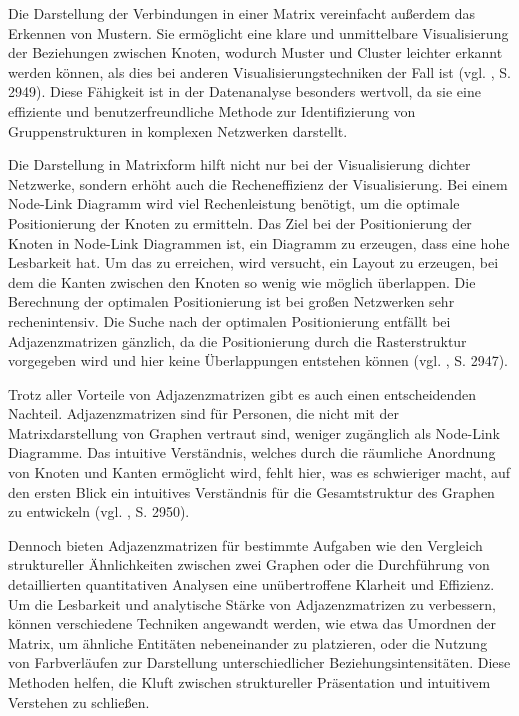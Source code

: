 Die Darstellung der Verbindungen in einer Matrix vereinfacht außerdem das Erkennen von Mustern. Sie ermöglicht eine klare und unmittelbare Visualisierung der Beziehungen zwischen Knoten, wodurch Muster und Cluster leichter erkannt werden können, als dies bei anderen Visualisierungstechniken der Fall ist (vgl. \cite{adjacencyOrNode:Okoe}, S. 2949). Diese Fähigkeit ist in der Datenanalyse besonders wertvoll, da sie eine effiziente und benutzerfreundliche Methode zur Identifizierung von Gruppenstrukturen in komplexen Netzwerken darstellt.

Die Darstellung in Matrixform hilft nicht nur bei der Visualisierung dichter Netzwerke, sondern erhöht auch die Recheneffizienz der Visualisierung. Bei einem Node-Link Diagramm wird viel Rechenleistung benötigt, um die optimale Positionierung der Knoten zu ermitteln. Das Ziel bei der Positionierung der Knoten in Node-Link Diagrammen ist, ein Diagramm zu erzeugen, dass eine hohe Lesbarkeit hat. Um das zu erreichen, wird versucht, ein Layout zu erzeugen, bei dem die Kanten zwischen den Knoten so wenig wie möglich überlappen. Die Berechnung der optimalen Positionierung ist bei großen Netzwerken sehr rechenintensiv. Die Suche nach der optimalen Positionierung entfällt bei Adjazenzmatrizen gänzlich, da die Positionierung durch die Rasterstruktur vorgegeben wird und hier keine Überlappungen entstehen können (vgl. \cite{adjacencyOrNode:Okoe}, S. 2947).

Trotz aller Vorteile von Adjazenzmatrizen gibt es auch einen entscheidenden Nachteil. Adjazenzmatrizen sind für Personen, die nicht mit der Matrixdarstellung von Graphen vertraut sind, weniger zugänglich als Node-Link Diagramme. Das intuitive Verständnis, welches durch die räumliche Anordnung von Knoten und Kanten ermöglicht wird, fehlt hier, was es schwieriger macht, auf den ersten Blick ein intuitives Verständnis für die Gesamtstruktur des Graphen zu entwickeln (vgl. \cite{adjacencyOrNode:Okoe}, S. 2950).

Dennoch bieten Adjazenzmatrizen für bestimmte Aufgaben wie den Vergleich struktureller Ähnlichkeiten zwischen zwei Graphen oder die Durchführung von detaillierten quantitativen Analysen eine unübertroffene Klarheit und Effizienz. Um die Lesbarkeit und analytische Stärke von Adjazenzmatrizen zu verbessern, können verschiedene Techniken angewandt werden, wie etwa das Umordnen der Matrix, um ähnliche Entitäten nebeneinander zu platzieren, oder die Nutzung von Farbverläufen zur Darstellung unterschiedlicher Beziehungsintensitäten. Diese Methoden helfen, die Kluft zwischen struktureller Präsentation und intuitivem Verstehen zu schließen.

